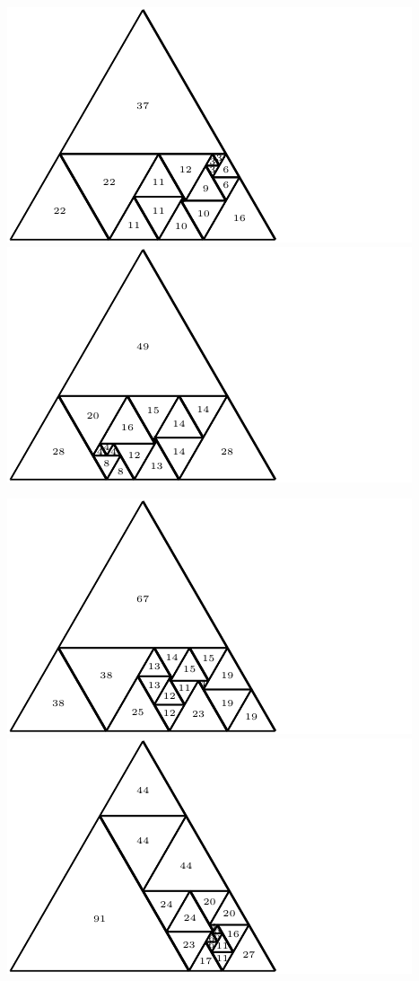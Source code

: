 \documentclass[12pt,amstags,fleqn]{article}
\theoremstyle{plain}
\theoremstyle{definition}
\begin{document}
\begin{center}
\includegraphics{max_relative_size_17.pdf}\includegraphics{max_relative_size_18.pdf}
\end{center}
\begin{center}
\includegraphics{max_relative_size_19.pdf}\includegraphics{max_relative_size_20.pdf}
\end{center}
\end{document}
